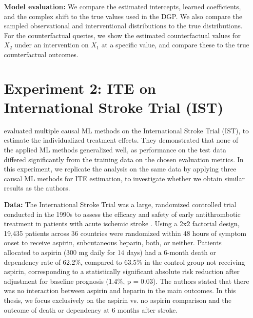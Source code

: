 \textbf{Model evaluation: } We compare the estimated intercepts, learned coefficients, and the complex shift to the true values used in the DGP. We also compare the sampled observational and interventional distributions to the true distributions. For the counterfactual queries, we show the estimated counterfactual values for $X_2$ under an intervention on $X_1$ at a specific value, and compare these to the true counterfactual outcomes.




\section{Experiment 2: ITE on International Stroke Trial (IST)} \label{sec:methods_experiment2}





% 
% 
\citet{chen2025} evaluated multiple causal ML methods on the International Stroke Trial (IST), to estimate the individualized treatment effects. They demonstrated that none of the applied ML methods generalized well, as performance on the test data differed significantly from the training data on the chosen evaluation metrics.
In this experiment, we replicate the analysis on the same data by applying three causal ML methods for ITE estimation, to investigate whether we obtain similar results as the authors.


\medskip

\textbf{Data:} The International Stroke Trial was a large, randomized controlled trial conducted in the 1990s to assess the efficacy and safety of early antithrombotic treatment in patients with acute ischemic stroke \citep{IST1997}. Using a 2x2 factorial design, 19,435 patients across 36 countries were randomized within 48 hours of symptom onset to receive aspirin, subcutaneous heparin, both, or neither. Patients allocated to aspirin (300 mg daily for 14 days) had a 6-month death or dependency rate of 62.2\%, compared to 63.5\% in the control group not receiving aspirin, corresponding to a statistically significant absolute risk reduction after adjustment for baseline prognosis (1.4\%, p = 0.03). The authors stated that there was no interaction between aspirin and heparin in the main outcomes. In this thesis, we focus exclusively on the aspirin vs. no aspirin comparison and the outcome of death or dependency at 6 months after stroke.

